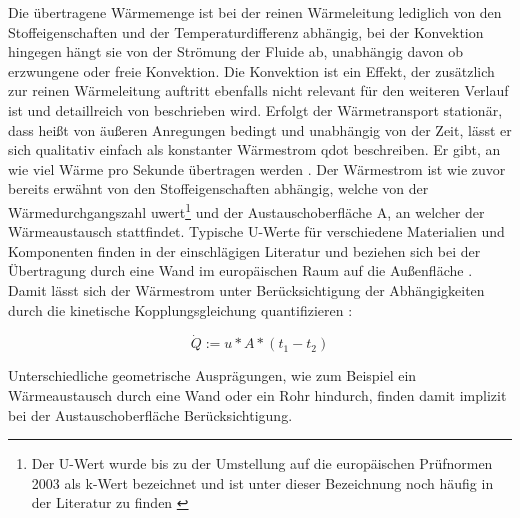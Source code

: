 Die übertragene Wärmemenge ist bei der reinen Wärmeleitung lediglich von den Stoffeigenschaften und der Temperaturdifferenz abhängig, bei der Konvektion hingegen hängt sie von der Strömung der Fluide ab, unabhängig davon ob erzwungene oder freie Konvektion. Die Konvektion ist ein Effekt, der zusätzlich zur reinen Wärmeleitung auftritt ebenfalls nicht relevant für den weiteren Verlauf ist und detaillreich von \cite{bo14} beschrieben wird.
Erfolgt der Wärmetransport stationär, dass heißt von äußeren Anregungen bedingt und unabhängig von der Zeit, lässt er sich qualitativ einfach als konstanter Wärmestrom \gls{qdot} beschreiben. Er gibt, an wie viel Wärme pro Sekunde übertragen werden \cite[S.~5ff.]{bo14}. 
Der Wärmestrom ist wie zuvor bereits erwähnt von den Stoffeigenschaften abhängig, welche von der Wärmedurchgangszahl \gls{uwert}\footnote{Der U-Wert wurde bis zu der Umstellung auf die europäischen Prüfnormen 2003 als k-Wert bezeichnet und ist unter dieser Bezeichnung noch häufig in der Literatur zu finden \cite[S.1~f.]{sa04}} und der Austauschoberfläche \gls{A}, an welcher der Wärmeaustausch stattfindet. Typische U-Werte für verschiedene Materialien und Komponenten finden in der einschlägigen Literatur und beziehen sich bei der Übertragung durch eine Wand im europäischen Raum auf die Außenfläche \cite[S.~28]{bo14}. Damit lässt sich der Wärmestrom unter Berücksichtigung der Abhängigkeiten durch die kinetische Kopplungsgleichung quantifizieren \cite[S.~6f.]{bo14}:

\begin{equation}
\label{eq:qdot}
\dot{Q} := u*A*(t_{1}-t_{2})
\end{equation}

Unterschiedliche geometrische Ausprägungen, wie zum Beispiel ein Wärmeaustausch durch eine Wand oder ein Rohr hindurch, finden damit implizit bei der Austauschoberfläche Berücksichtigung.